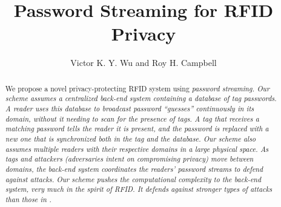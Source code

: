 %


\title{Password Streaming for RFID Privacy}

\author{Victor K. Y. Wu and Roy H. Campbell}


\maketitle

\begin{abstract}
We propose a novel privacy-protecting RFID system using \em password streaming\em.  Our scheme assumes a centralized back-end system containing a database of tag passwords.  A reader uses this database to broadcast password ``guesses'' continuously in its domain, without it needing to scan for the presence of tags.  A tag that receives a matching password tells the reader it is present, and the password is replaced with a new one that is synchronized both in the tag and the database.  Our scheme also assumes multiple readers with their respective domains in a large physical space.  As tags and attackers (adversaries intent on compromising privacy) move between domains, the back-end system coordinates the readers' password streams to defend against attacks.  Our scheme pushes the computational complexity to the back-end system, very much in the spirit of RFID.  It defends against stronger types of attacks than those in \cite{conf:Juels01}.
\end{abstract}

